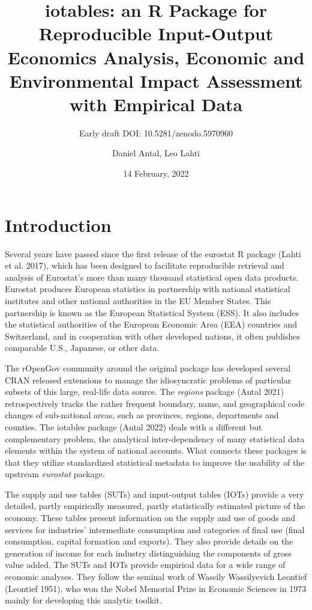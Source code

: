 \documentclass[
]{article}
\title{iotables: an R Package for Reproducible Input-Output Economics
Analysis, Economic and Environmental Impact Assessment with Empirical
Data}
\subtitle{Early draft DOI: 10.5281/zenodo.5970960}
\author{Daniel Antal, Leo Lahti}
\date{14 February, 2022}
\begin{document}
\maketitle

\hypertarget{introduction}{%
\section{Introduction}\label{introduction}}

Several years have passed since the first release of the eurostat R
package (Lahti et al. 2017), which has been designed to facilitate
reproducible retrieval and analysis of Eurostat's more than many
thousand statistical open data products. Eurostat produces European
statistics in partnership with national statistical institutes and other
national authorities in the EU Member States. This partnership is known
as the European Statistical System (ESS). It also includes the
statistical authorities of the European Economic Area (EEA) countries
and Switzerland, and in cooperation with other developed nations, it
often publishes comparable U.S., Japanese, or other data.

The rOpenGov community around the original package has developed several
CRAN released extensions to manage the idiosyncratic problems of
particular subsets of this large, real-life data source. The
\emph{regions} package (Antal 2021) retrospectively tracks the rather
frequent boundary, name, and geographical code changes of sub-national
areas, such as provinces, regions, departments and counties. The
iotables package (Antal 2022) deals with a different but complementary
problem, the analytical inter-dependency of many statistical data
elements within the system of national accounts. What connects these
packages is that they utilize standardized statistical metadata to
improve the usability of the upstream \emph{eurostat} package.

The supply and use tables (SUTs) and input-output tables (IOTs) provide
a very detailed, partly empirically measured, partly statistically
estimated picture of the economy. These tables present information on
the supply and use of goods and services for industries' intermediate
consumption and categories of final use (final consumption, capital
formation and exports). They also provide details on the generation of
income for each industry distinguishing the components of gross value
added. The SUTs and IOTs provide empirical data for a wide range of
economic analyses. They follow the seminal work of Wassily Wassilyevich
Leontief (Leontief 1951), who won the Nobel Memorial Prize in Economic
Sciences in 1973 mainly for developing this analytic toolkit.
\end{document}
